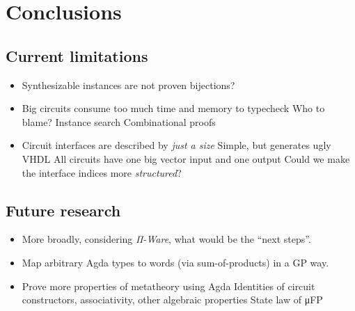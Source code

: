 \chapter{Conclusions}
\label{chap:conclusions}

    \section{Current limitations}
    \label{sec:current-limitations}
        \begin{itemize}
            \item Synthesizable instances are not proven bijections?
            \item Big circuits consume too much time and memory to typecheck
                \subitem Who to blame?
                \subitem Instance search
                \subitem Combinational proofs
            \item Circuit interfaces are described by \emph{just a size}
                \subitem Simple, but generates ugly VHDL
                \subitem All circuits have one big vector input and one output
                \subitem Could we make the interface indices more \emph{structured}?
        \end{itemize}

    \section{Future research}
    \label{sec:future-research}
        \begin{itemize}
            \item More broadly, considering \emph{Π-Ware}, what would be the ``next steps''.
            \item Map arbitrary Agda types to words (via sum-of-products) in a GP way.
            \item Prove more properties of metatheory using Agda
                \subitem Identities of circuit constructors, associativity, other algebraic properties
                \subitem State law of μFP
        \end{itemize}

